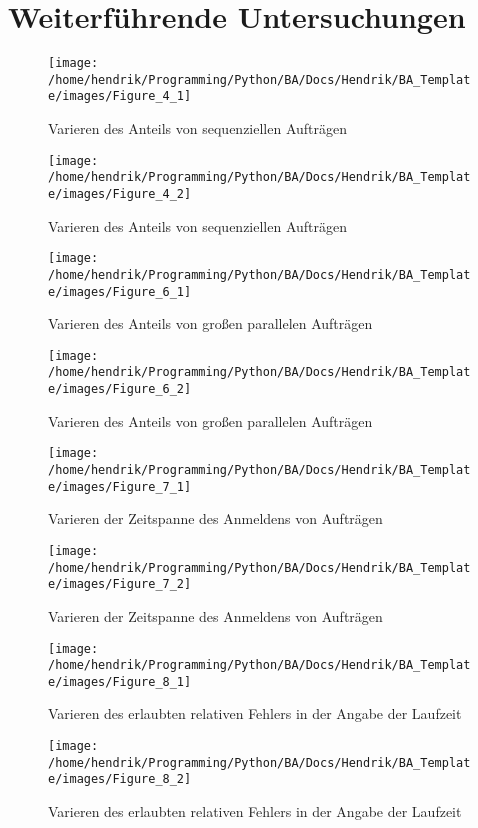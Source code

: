 \section{Weiterführende Untersuchungen}
\label{weiter}

\begin{figure}	
	\texttt{[image: /home/hendrik/Programming/Python/BA/Docs/Hendrik/BA\_Template/images/Figure\_4\_1]}
	\caption{Varieren des Anteils von sequenziellen Aufträgen}
	\label{figure_4_1}
\end{figure}
\begin{figure}	
	\texttt{[image: /home/hendrik/Programming/Python/BA/Docs/Hendrik/BA\_Template/images/Figure\_4\_2]}
	\caption{Varieren des Anteils von sequenziellen Aufträgen}
	\label{figure_4_2}
\end{figure}
\begin{figure}	
	\texttt{[image: /home/hendrik/Programming/Python/BA/Docs/Hendrik/BA\_Template/images/Figure\_6\_1]}
	\caption{Varieren des Anteils von großen parallelen Aufträgen}
	\label{figure_6_1}
\end{figure}
\begin{figure}	
	\texttt{[image: /home/hendrik/Programming/Python/BA/Docs/Hendrik/BA\_Template/images/Figure\_6\_2]}
	\caption{Varieren des Anteils von großen parallelen Aufträgen}
	\label{figure_6_2}
\end{figure}
\begin{figure}	
	\texttt{[image: /home/hendrik/Programming/Python/BA/Docs/Hendrik/BA\_Template/images/Figure\_7\_1]}
	\caption{Varieren der Zeitspanne des Anmeldens von Aufträgen}
	\label{figure_7_1}
\end{figure}
\begin{figure}	
	\texttt{[image: /home/hendrik/Programming/Python/BA/Docs/Hendrik/BA\_Template/images/Figure\_7\_2]}
	\caption{Varieren der Zeitspanne des Anmeldens von Aufträgen}
	\label{figure_7_2}
\end{figure}
\begin{figure}	
	\texttt{[image: /home/hendrik/Programming/Python/BA/Docs/Hendrik/BA\_Template/images/Figure\_8\_1]}
	\caption{Varieren des erlaubten relativen Fehlers in der Angabe der Laufzeit}
	\label{figure_8_1}
\end{figure}
\begin{figure}	
	\texttt{[image: /home/hendrik/Programming/Python/BA/Docs/Hendrik/BA\_Template/images/Figure\_8\_2]}
	\caption{Varieren des erlaubten relativen Fehlers in der Angabe der Laufzeit}
	\label{figure_8_2}
\end{figure}


